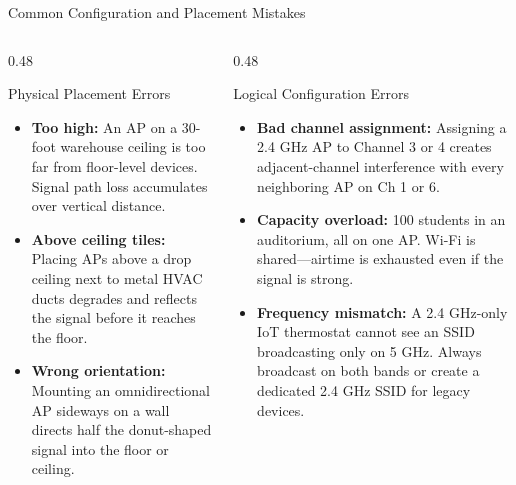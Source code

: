 \documentclass[aspectratio=169]{beamer}
\begin{document}
\begin{frame}{Common Configuration and Placement Mistakes}
    \begin{columns}[T]
        \begin{column}{0.48\textwidth}
            \begin{block}{Physical Placement Errors}
                \footnotesize
                \begin{itemize}
                    \item \textbf{Too high:} An AP on a 30-foot warehouse ceiling is too far from floor-level devices. Signal path loss accumulates over vertical distance.
                    \item \textbf{Above ceiling tiles:} Placing APs above a drop ceiling next to metal HVAC ducts degrades and reflects the signal before it reaches the floor.
                    \item \textbf{Wrong orientation:} Mounting an omnidirectional AP sideways on a wall directs half the donut-shaped signal into the floor or ceiling.
                \end{itemize}
            \end{block}
        \end{column}
        \begin{column}{0.48\textwidth}
            \begin{block}{Logical Configuration Errors}
                \footnotesize
                \begin{itemize}
                    \item \textbf{Bad channel assignment:} Assigning a 2.4 GHz AP to Channel 3 or 4 creates adjacent-channel interference with every neighboring AP on Ch 1 or 6.
                    \item \textbf{Capacity overload:} 100 students in an auditorium, all on one AP. Wi-Fi is shared---airtime is exhausted even if the signal is strong.
                    \item \textbf{Frequency mismatch:} A 2.4 GHz-only IoT thermostat cannot see an SSID broadcasting only on 5 GHz. Always broadcast on both bands or create a dedicated 2.4 GHz SSID for legacy devices.
                \end{itemize}
            \end{block}
        \end{column}
    \end{columns}
\end{frame}
\end{document}
